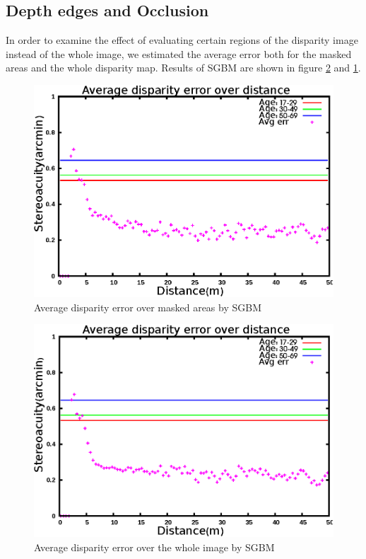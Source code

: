 \subsection{Depth edges and Occlusion}
In order to examine the effect of evaluating certain regions of the disparity image instead of the whole image, 
we estimated the average error both for the masked areas and the whole disparity map. 
Results of SGBM are shown in figure \ref{fig:sgbmfull3} and \ref{fig:sgbmmsk3}.

\begin{figure}[H]
\centering
\includegraphics[scale=0.8]{sgbmmsk3}
\caption{Average disparity error over masked areas by SGBM}
\label{fig:sgbmmsk3}
\end{figure} 

\begin{figure}[H]
\centering
\includegraphics[scale=0.8]{sgbmfull3}
\caption{Average disparity error over the whole image by SGBM}
\label{fig:sgbmfull3}
\end{figure} 

